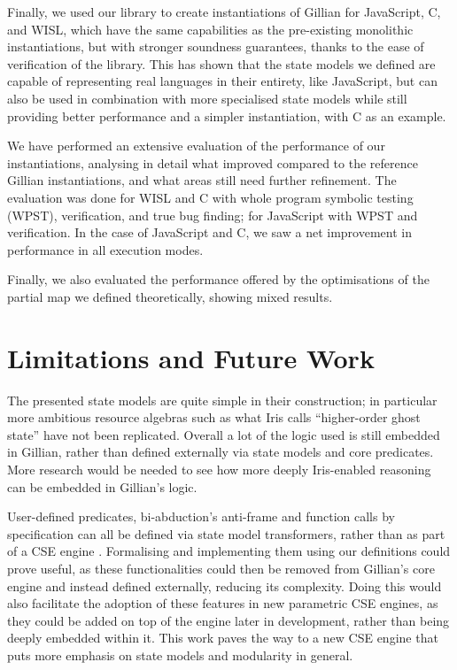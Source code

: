 Finally, we used our library to create instantiations of Gillian for JavaScript, C, and WISL, which have the same capabilities as the pre-existing monolithic instantiations, but with stronger soundness guarantees, thanks to the ease of verification of the library. This has shown that the state models we defined are capable of representing real languages in their entirety, like JavaScript, but can also be used in combination with more specialised state models while still providing better performance and a simpler instantiation, with C as an example.

We have performed an extensive evaluation of the performance of our instantiations, analysing in detail what improved compared to the reference Gillian instantiations, and what areas still need further refinement. The evaluation was done for WISL and C with whole program symbolic testing (WPST), verification, and true bug finding; for JavaScript with WPST and verification. In the case of JavaScript and C, we saw a net improvement in performance in all execution modes.

Finally, we also evaluated the performance offered by the optimisations of the partial map we defined theoretically, showing mixed results.

\section{Limitations and Future Work}

The presented state models are quite simple in their construction; in particular more ambitious resource algebras such as what Iris calls ``higher-order ghost state'' \cite{iris} have not been replicated. Overall a lot of the logic used is still embedded in Gillian, rather than defined externally via state models and core predicates. More research would be needed to see how more deeply Iris-enabled reasoning can be embedded in Gillian's logic.

User-defined predicates, bi-abduction's anti-frame and function calls by specification can all be defined via state model transformers, rather than as part of a CSE engine \cite{sacha-phd}. Formalising and implementing them using our definitions could prove useful, as these functionalities could then be removed from Gillian's core engine and instead defined externally, reducing its complexity. Doing this would also facilitate the adoption of these features in new parametric CSE engines, as they could be added on top of the engine later in development, rather than being deeply embedded within it. This work paves the way to a new CSE engine that puts more emphasis on state models and modularity in general.

